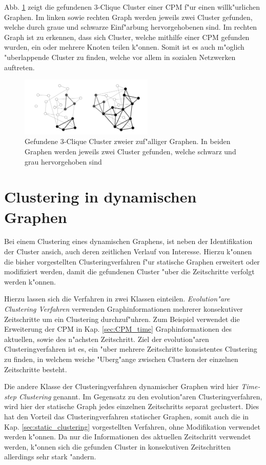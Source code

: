 \documentclass[journal]{vgtc}
\begin{document}
    Abb. \ref{fig:CPM} zeigt die gefundenen 3-Clique Cluster einer CPM f"ur einen willk"urlichen Graphen.
    Im linken sowie rechten Graph werden jeweils zwei Cluster gefunden, welche durch graue und schwarze
    Einf"arbung hervorgehobenen sind. Im rechten Graph ist zu erkennen, dass sich Cluster, welche mithilfe einer
    CPM gefunden wurden, ein oder mehrere Knoten teilen k"onnen. Somit ist es auch m"oglich "uberlappende Cluster
    zu finden, welche vor allem in sozialen Netzwerken auftreten.
    \begin{figure}[h]
     \centering
     \includegraphics[width=2.5in]{images/k-cliques}
     \caption{\label{fig:CPM} Gefundene 3-Clique Cluster zweier zuf"alliger Graphen. In beiden Graphen werden jeweils zwei
		Cluster gefunden, welche schwarz und grau hervorgehoben sind \cite{CPM}}
    \end{figure}


\section{Clustering in dynamischen Graphen}
  \label{sec:dynamic_clustering}
  Bei einem Clustering eines dynamischen Graphens, ist neben der Identifikation der Cluster ansich, auch deren
  zeitlichen Verlauf von Interesse. Hierzu k"onnen die bisher vorgestellten Clusteringverfahren f"ur statische
  Graphen erweitert oder modifiziert werden, damit die gefundenen Cluster "uber die Zeitschritte verfolgt werden
  k"onnen.
  
  Hierzu lassen sich die Verfahren in zwei Klassen einteilen. \emph{Evolution"are Clustering Verfahren}\cite{evolutionary_clustering}
  verwenden Graphinformationen mehrerer konsekutiver Zeitschritte um ein Clustering durchzuf"uhren. Zum Beispiel verwendet die Erweiterung der CPM
  in Kap. \ref{sec:CPM_time} Graphinformationen des aktuellen, sowie des n"achsten Zeitschritt. Ziel der evolution"aren Clusteringverfahren
  ist es, ein "uber mehrere Zeitschritte konsistentes Clustering zu finden, in welchem weiche "Uberg"ange zwischen Clustern der einzelnen Zeitschritte
  besteht.
  
  Die andere Klasse der Clusteringverfahren dynamischer Graphen wird hier \emph{Time-step Clustering} genannt. Im Gegensatz zu den evolution"aren
  Clusteringverfahren, wird hier der statische Graph jedes einzelnen Zeitschritts separat geclustert. Dies hat den Vorteil das
  Clusteringverfahren statischer Graphen, somit auch die in Kap. \ref{sec:static_clustering} vorgestellten Verfahren, ohne Modifikation
  verwendet werden k"onnen. Da nur die Informationen des aktuellen Zeitschritt verwendet werden, k"onnen sich die gefunden Cluster in konsekutiven
  Zeitschritten allerdings sehr stark "andern.
  
\end{document}
